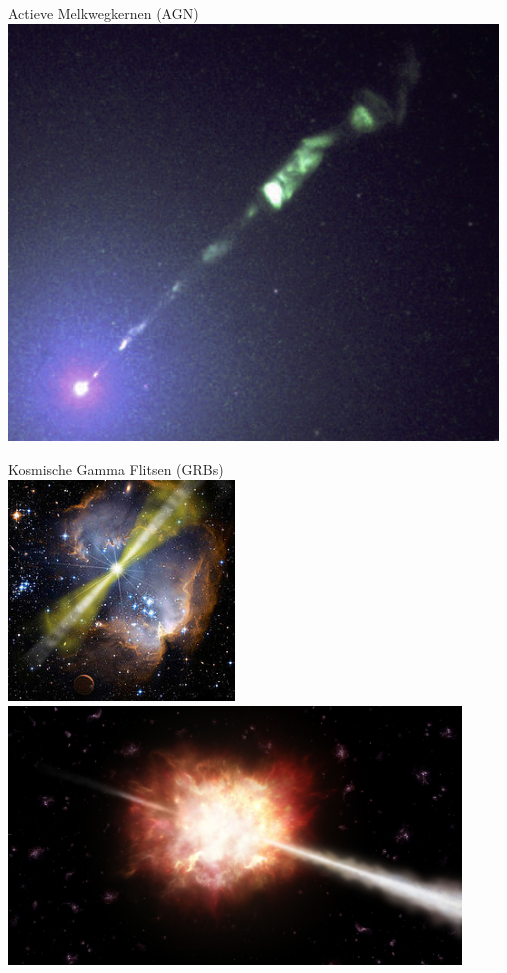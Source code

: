 \Tr
\begin{center}
{\blue Actieve Melkwegkernen (AGN)}\\[1cm]
\includegraphics[keepaspectratio,width=13cm]{M87jet}
\end{center}

\newpage

\begin{center}
{\blue Kosmische Gamma Flitsen (GRBs)}\\[1cm]
\includegraphics[keepaspectratio,width=6cm]{grb}\\[3mm]
\includegraphics[keepaspectratio,width=12cm]{grb2}
\end{center}

